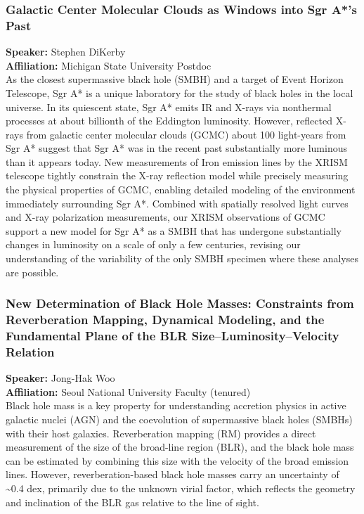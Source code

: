 \hypertarget{abs-23}{}
\subsubsection*{Galactic Center Molecular Clouds as Windows into Sgr A*'s Past}
\textbf{Speaker:} Stephen DiKerby \\
\textbf{Affiliation:} Michigan State University \textperiodcentered{} Postdoc\\
As the closest supermassive black hole (SMBH) and a target of Event Horizon Telescope, Sgr A* is a unique laboratory for the study of black holes in the local universe. In its quiescent state, Sgr A* emits IR and X-rays via nonthermal processes at about billionth of the Eddington luminosity. However, reflected X-rays from galactic center molecular clouds (GCMC) about 100 light-years from Sgr A* suggest that Sgr A* was in the recent past substantially more luminous than it appears today. New measurements of Iron emission lines by the XRISM telescope tightly constrain the X-ray reflection model while precisely measuring the physical properties of GCMC, enabling detailed modeling of the environment immediately surrounding Sgr A*. Combined with spatially resolved light curves and X-ray polarization measurements, our XRISM observations of GCMC support a new model for Sgr A* as a SMBH that has undergone substantially changes in luminosity on a scale of only a few centuries, revising our understanding of the variability of the only SMBH specimen where these analyses are possible.

\hypertarget{abs-24}{}
\subsubsection*{New Determination of Black Hole Masses: Constraints from Reverberation Mapping, Dynamical Modeling, and the Fundamental Plane of the BLR Size–Luminosity–Velocity Relation}
\textbf{Speaker:} Jong-Hak Woo \\
\textbf{Affiliation:} Seoul National University \textperiodcentered{} Faculty (tenured)\\
Black hole mass is a key property for understanding accretion physics in active galactic nuclei (AGN) and the coevolution of supermassive black holes (SMBHs) with their host galaxies. Reverberation mapping (RM) provides a direct measurement of the size of the broad-line region (BLR), and the black hole mass can be estimated by combining this size with the velocity of the broad emission lines. However, reverberation-based black hole masses carry an uncertainty of \textasciitilde{}0.4 dex, primarily due to the unknown virial factor, which reflects the geometry and inclination of the BLR gas relative to the line of sight.


